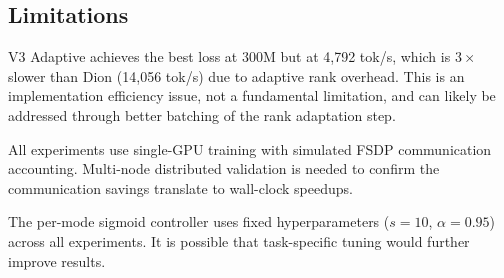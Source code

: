 \documentclass[11pt]{article}
\begin{document}
\subsection{Limitations}

V3 Adaptive achieves the best loss at 300M but at 4{,}792 tok/s, which is $3\times$ slower than Dion (14{,}056 tok/s) due to adaptive rank overhead. This is an implementation efficiency issue, not a fundamental limitation, and can likely be addressed through better batching of the rank adaptation step.

All experiments use single-GPU training with simulated FSDP communication accounting. Multi-node distributed validation is needed to confirm the communication savings translate to wall-clock speedups.

The per-mode sigmoid controller uses fixed hyperparameters ($s = 10$, $\alpha = 0.95$) across all experiments. It is possible that task-specific tuning would further improve results.



\end{document}
